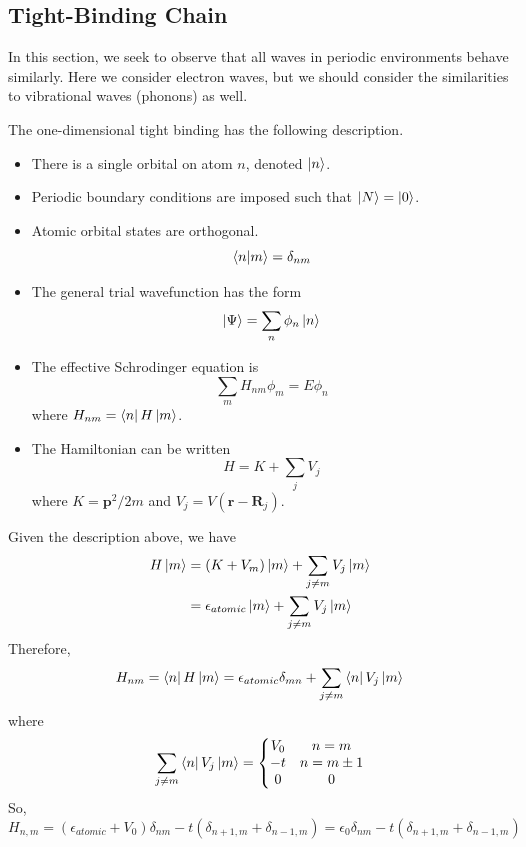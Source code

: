\documentclass[10pt]{article}
\begin{document}
\subsection{Tight-Binding Chain}
In this section, we seek to observe that all waves in periodic environments behave similarly. Here
we consider electron waves, but we should consider the similarities to vibrational waves (phonons) as
well.

The one-dimensional tight binding has the following description.
\begin{itemize}
  \item There is a single orbital on atom $n$, denoted $\ket{n}$.
  \item Periodic boundary conditions are imposed such that $\ket{N} = \ket{0}$.
  \item Atomic orbital states are orthogonal.
  $$\bra{n}\ket{m} = \delta_{nm}$$
  \item The general trial wavefunction has the form
  $$\ket{\Psi} = \sum_{n}\phi_{n}\ket{n}$$
  \item The effective Schrodinger equation is
  $$
  \sum_{m}H_{nm}\phi_{m} = E\phi_{n}
  $$
  where $H_{nm} = \bra{n}H\ket{m}$.
  \item The Hamiltonian can be written
  $$
  H = K + \sum_{j}V_{j}
  $$
  where $K = \textbf{p}^{2}/2m$ and $V_{j} = V(\textbf{r} - \textbf{R}_{j})$.
\end{itemize}
Given the description above, we have
\begin{equation}
\begin{aligned}
  H\ket{m} & = (K + V_{m})\ket{m} + \sum_{j \neq m}V_{j}\ket{m} \\
           & = \epsilon_{atomic}\ket{m} + \sum_{j \neq m}V_{j}\ket{m}
\end{aligned}
\end{equation}
Therefore,
$$
H_{nm} = \bra{n}H\ket{m} = \epsilon_{atomic}\delta_{mn} + \sum_{j \neq m}\bra{n}V_{j}\ket{m}
$$
where
$$
\sum_{j \neq m}\bra{n}V_{j}\ket{m} = \left\{\begin{matrix}
 V_{0} & n=m \\
 -t & n=m\pm 1\\
 0 & 0
\end{matrix}\right.
$$
So,
$$
H_{n,m} = (\epsilon_{atomic} + V_{0})\delta_{nm} -t(\delta_{n+1,m} + \delta_{n-1,m}) = \epsilon_{0}\delta_{nm} -t(\delta_{n+1,m} + \delta_{n-1,m})
$$
\end{document}

